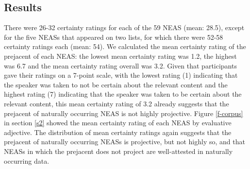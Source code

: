 \documentclass[11pt,fleqn]{article}
\newcommand{\6}{\mbox{$[\hspace*{-.6mm}[$}}
\newcommand{\9}{\mbox{$]\hspace*{-.6mm}]$}}
\begin{document}
\subsection{Results}

There were 26-32 certainty ratings for each of the 59 NEAS (mean: 28.5), except for the five NEASs that appeared on two lists, for which there were 52-58 certainty ratings each (mean: 54). We calculated the mean certainty rating of the prejacent of each NEAS: the lowest mean certainty rating was 1.2, the highest was 6.7 and the mean certainty rating overall was 3.2. Given that participants gave their ratings on a 7-point scale, with the lowest rating (1) indicating that the speaker was taken to not be certain about the relevant content and the highest rating (7) indicating that the speaker was taken to be certain about the relevant content, this mean certainty rating of 3.2 already suggests that the prejacent of naturally occurring NEAS is not highly projective. Figure \ref{f-corpus} in section \ref{s2} showed the mean certainty rating of each NEAS by evaluative adjective. The distribution of mean certainty ratings again suggests that the prejacent of naturally occurring NEASs is projective, but not highly so, and that NEASs in which the prejacent does not project are well-attested in naturally occurring data. 
%
\end{document}
